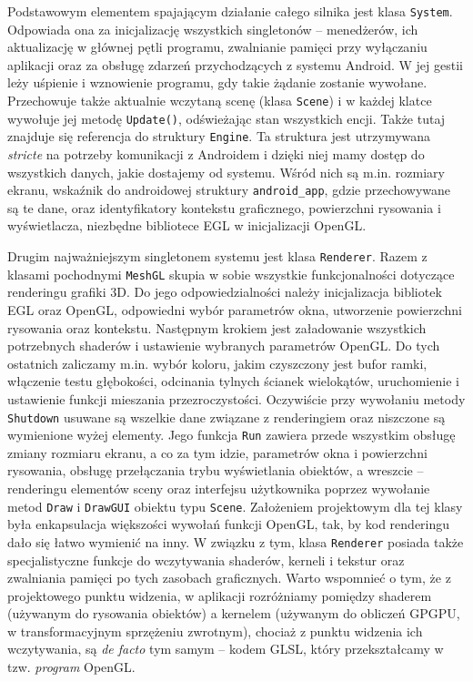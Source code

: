 	Podstawowym elementem spajającym działanie całego silnika jest klasa \texttt{System}. Odpowiada ona za inicjalizację wszystkich singletonów -- menedżerów, ich aktualizację w głównej pętli programu, zwalnianie pamięci przy wyłączaniu aplikacji oraz za obsługę zdarzeń przychodzących z systemu Android. W jej gestii leży uśpienie i wznowienie programu, gdy takie żądanie zostanie wywołane. Przechowuje także aktualnie wczytaną scenę (klasa \texttt{Scene}) i w każdej klatce wywołuje jej metodę \texttt{Update()}, odświeżając stan wszystkich encji. Także tutaj znajduje się referencja do struktury \texttt{Engine}. Ta struktura jest utrzymywana \emph{stricte} na potrzeby komunikacji z Androidem i dzięki niej mamy dostęp do wszystkich danych, jakie dostajemy od systemu. Wśród nich są m.in. rozmiary ekranu, wskaźnik do androidowej struktury \texttt{android\_app}, gdzie przechowywane są te dane, oraz identyfikatory kontekstu graficznego, powierzchni rysowania i wyświetlacza, niezbędne bibliotece EGL w inicjalizacji OpenGL.
	
	Drugim najważniejszym singletonem systemu jest klasa \texttt{Renderer}. Razem z klasami pochodnymi \texttt{MeshGL} skupia w sobie wszystkie funkcjonalności dotyczące renderingu grafiki 3D. Do jego odpowiedzialności należy inicjalizacja bibliotek EGL oraz OpenGL, odpowiedni wybór parametrów okna, utworzenie powierzchni rysowania oraz kontekstu. Następnym krokiem jest załadowanie wszystkich potrzebnych shaderów i ustawienie wybranych parametrów OpenGL. Do tych ostatnich zaliczamy m.in. wybór koloru, jakim czyszczony jest bufor ramki, włączenie testu głębokości, odcinania tylnych ścianek wielokątów, uruchomienie i ustawienie funkcji mieszania przezroczystości. Oczywiście przy wywołaniu metody \texttt{Shutdown} usuwane są wszelkie dane związane z renderingiem oraz niszczone są wymienione wyżej elementy. Jego funkcja \texttt{Run} zawiera przede wszystkim obsługę zmiany rozmiaru ekranu, a co za tym idzie, parametrów okna i powierzchni rysowania, obsługę przełączania trybu wyświetlania obiektów, a wreszcie -- renderingu elementów sceny oraz interfejsu użytkownika poprzez wywołanie metod \texttt{Draw} i \texttt{DrawGUI} obiektu typu \texttt{Scene}. Założeniem projektowym dla tej klasy była enkapsulacja większości wywołań funkcji OpenGL, tak, by kod renderingu dało się łatwo wymienić na inny. W związku z tym, klasa \texttt{Renderer} posiada także specjalistyczne funkcje do wczytywania shaderów, kerneli i tekstur oraz zwalniania pamięci po tych zasobach graficznych. Warto wspomnieć o tym, że z projektowego punktu widzenia, w aplikacji rozróżniamy pomiędzy shaderem (używanym do rysowania obiektów) a kernelem (używanym do obliczeń GPGPU, w transformacyjnym sprzężeniu zwrotnym), chociaż z punktu widzenia ich wczytywania, są \emph{de facto} tym samym -- kodem GLSL, który przekształcamy w tzw. \emph{program} OpenGL. 
	
